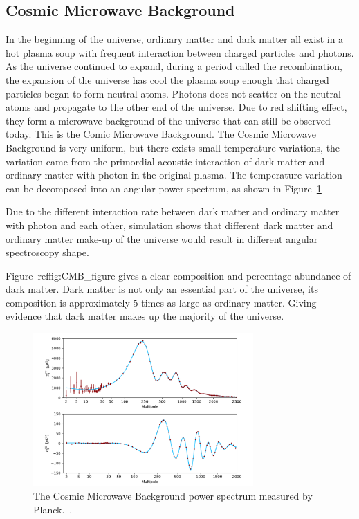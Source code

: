 \subsection{Cosmic Microwave Background}
In the beginning of the universe, ordinary matter and dark matter all exist in a hot plasma soup with frequent interaction between charged particles and photons. As the universe continued to expand, during a period called the recombination, the expansion of the universe has cool the plasma soup enough that charged particles began to form neutral atoms. Photons does not scatter on the neutral atoms and propagate to the other end of the universe. Due to red shifting effect, they form a
microwave background of the universe that can still be observed today. This is the Comic Microwave Background. The Cosmic Microwave Background is very uniform, but there exists small temperature variations, the variation came from the primordial acoustic interaction of dark matter and ordinary matter with photon in the original plasma. The temperature variation can be decomposed into an angular power spectrum, as shown in Figure~\ref{fig:CMB_figure}

Due to the different interaction rate between dark matter and ordinary matter with photon and each other, simulation shows that different dark matter and ordinary matter make-up of the universe would result in different angular spectroscopy shape. 

Figure~ref{fig:CMB_figure} gives a clear composition and percentage abundance of dark matter. Dark matter is not only an essential part of the universe, its composition is approximately 5 times as large as ordinary matter. Giving evidence that dark matter makes up the majority of the universe. 

\begin{figure}[!htb]
    \begin{center}
        \includegraphics[width=0.75\textwidth]{figures/chapter_DM/CMB-angular-power-spectrum}
        \caption{
			The Cosmic Microwave Background power spectrum measured by Planck.~\cite{CMB}.
        }
        \label{fig:CMB_figure}
    \end{center}
\end{figure}

